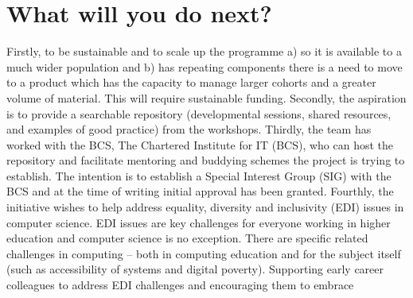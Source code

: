 \documentclass[sigconf]{acmart}
\begin{document}
\section{What will you do next?}
\begin{comment}

Scaling up


Funding 


Shared CPD learning materials


Address EDI issues in computer science


Reverse mentoring


Align with BCS


Special interest group

Web space for repository and functionality (mentoring, buddying) to store CPD sessions, shared resources for new CS academics, examples of good practice and a discussion space.

Explore what BCS are doing with professionals in non academic roles

Encourage research on pedagogy and educational issues in CS

Examine if programme framework is transferrable to other disciplines
\end{comment}
Firstly, to be sustainable and to scale up the programme a) so it is
available to a much wider population and b) has repeating components
there is a need to move to a product which has the capacity to manage
larger cohorts and a greater volume of material. This will require
sustainable funding. Secondly, the aspiration is to provide a
searchable repository (developmental sessions, shared resources, and
examples of good practice) from the workshops. Thirdly, the team has
worked with the BCS, The Chartered Institute for IT (BCS), who can
host the repository and facilitate mentoring and buddying schemes the
project is trying to establish. The intention is to establish a
Special Interest Group (SIG) with the BCS \cite{BCSSIG} and at the
time of writing initial approval has been granted. Fourthly, the
initiative wishes to help address equality, diversity and inclusivity
(EDI) issues in computer science. EDI issues are key challenges for
everyone working in higher education and computer science is no
exception. There are specific related challenges in computing – both
in computing education and for the subject itself (such as
accessibility of systems and digital poverty). Supporting early career
colleagues to address EDI challenges and encouraging them to embrace
\end{document}
